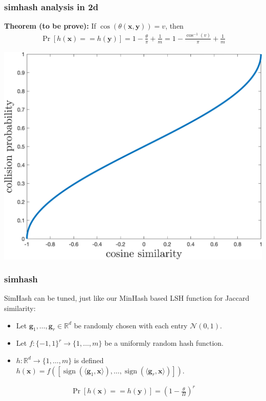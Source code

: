 \documentclass[compress]{beamer}
\newcommand{\bv}[1]{\mathbf{#1}}
\newcommand{\R}{\mathbb{R}}
\DeclareMathOperator{\sign}{sign}
\begin{document}
%		



\begin{frame}[t]
	\frametitle{simhash analysis in 2d}
	\textbf{Theorem (to be prove):} If $\cos(\theta(\bv{x},\bv{y})) = v$, then 
	\begin{align*}
		\Pr[h(\bv{x}) == h(\bv{y})] = 1 - \frac{\theta}{\pi}  + \frac{1}{m}= 1 - \frac{\cos^{-1}(v)}{\pi} + \frac{1}{m}
	\end{align*}
	\begin{center}
		\includegraphics[width=.6\textwidth]{cosine_sim.png}
	\end{center}
\end{frame}

\begin{frame}
	\frametitle{simhash}
	SimHash can be tuned, just like our MinHash based LSH function for Jaccard similarity:
	\begin{itemize}
		\item Let $\bv{g}_1,\ldots, \bv{g}_r \in \R^d$ be randomly chosen with each entry $\mathcal{N}(0,1)$. 
		\item Let $f: \{-1,1\}^r \rightarrow \{1,\ldots, m\}$ be a uniformly random hash function. 
		\item $h: \R^d \rightarrow \{1,\ldots, m\}$ is defined $h(\bv{x}) = f\left([\sign(\langle \bv{g}_1, \bv{x} \rangle),\ldots, \sign(\langle \bv{g}_r, \bv{x} \rangle)]\right)$.
	\end{itemize}
\begin{align*}
	\Pr[h(\bv{x}) == h(\bv{y})] = \left(1-\frac{\theta}{\Pi}\right)^r
\end{align*}
\end{frame}
\end{document}
